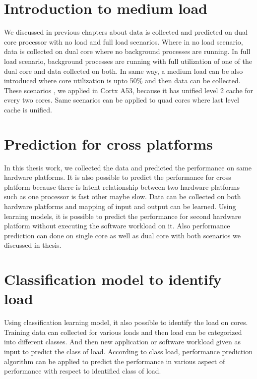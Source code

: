\setlength{\parindent}{4em}
\setlength{\parskip}{1em}

\section{Introduction to medium load}
We discussed in previous chapters about data is collected and predicted on dual core processor with no load and full load scenarios. Where in no load scenario, data is collected on dual core where no background processes are running. In full load scenario, background processes are running with full utilization of one of the dual core and data collected on both. In same way, a medium load can be also introduced where core utilization is upto 50\% and then data can be collected. These scenarios , we applied in Cortx A53, because it has unified level 2 cache for every two cores.  Same scenarios can be applied to quad cores where last level cache is unified.

\section{Prediction for cross platforms}
In this thesis work, we collected the data and predicted the performance on same hardware platforms. It is also possible to predict the performance for cross platform because there is latent relationship between two hardware platforms such as one processor is fast other maybe slow. Data can be collected on both hardware platforms and mapping of input and output can be learned. Using learning models, it is possible to predict the performance for second hardware platform without executing the software workload on it. Also performance prediction can done on single core as well as dual core with both scenarios we discussed in thesis. 

\section{Classification model to identify load}
Using classification learning model, it also possible to identify the load on cores. Training data can collected for various loads and then load can be categorized into different classes. And then new application or software workload given as input to predict the class of load. According to class load, performance prediction algorithm can be applied to predict the performance in various aspect of performance with respect to identified class of load. 


 